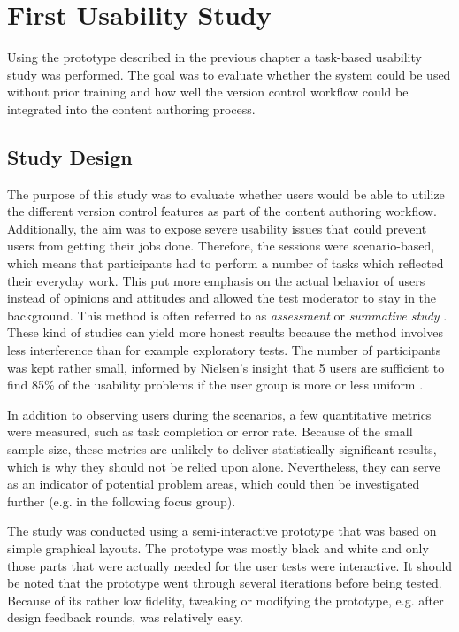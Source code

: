 \chapter{First Usability Study} \label{chapter:first-iteration}
Using the prototype described in the previous chapter a task-based usability study was performed. The goal was to evaluate whether the system could be used without prior training and how well the version control workflow could be integrated into the content authoring process.

\section{Study Design}
The purpose of this study was to evaluate whether users would be able to utilize the different version control features as part of the content authoring workflow. Additionally, the aim was to expose severe usability issues that could prevent users from getting their jobs done. Therefore, the sessions were scenario-based, which means that participants had to perform a number of tasks which reflected their everyday work. This put more emphasis on the actual behavior of users instead of opinions and attitudes and allowed the test moderator to stay in the background. This method is often referred to as \textit{assessment} or \textit{summative study} \cite{rubin_handbook_2008,goodman_observing_2012}. These kind of studies can yield more honest results because the method involves less interference than for example exploratory tests. The number of participants was kept rather small, informed by Nielsen's insight that 5 users are sufficient to find 85\% of the usability problems if the user group is more or less uniform \cite{nielsen_why_2000}.

In addition to observing users during the scenarios, a few quantitative metrics were measured, such as task completion or error rate. Because of the small sample size, these metrics are unlikely to deliver statistically significant results, which is why they should not be relied upon alone. Nevertheless, they can serve as an indicator of potential problem areas, which could then be investigated further (e.g. in the following focus group).

The study was conducted using a semi-interactive prototype that was based on simple graphical layouts. The prototype was mostly black and white and only those parts that were actually needed for the user tests were interactive. It should be noted that the prototype went through several iterations before being tested. Because of its rather low fidelity, tweaking or modifying the prototype, e.g. after design feedback rounds, was relatively easy.

